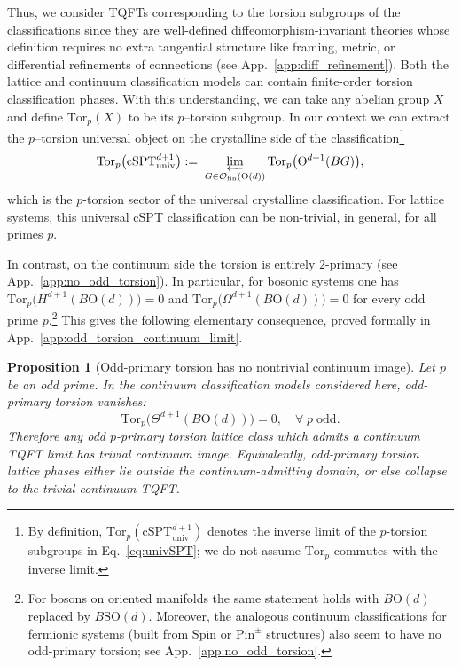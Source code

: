 \documentclass[aps,prx,reprint,superscriptaddress,twocolumn,amsmath,amssymb,amsfonts, nofootinbib]{revtex4-2}
\newcommand{\SO}{\text{SO}}
\newcommand{\tor}{\text{Tor}}
\theoremstyle{apsstyle}
\newtheorem{proposition}[theorem]{Proposition}
\begin{document}
Thus, we consider TQFTs corresponding to the torsion subgroups of the classifications since they are well-defined diffeomorphism-invariant theories whose definition requires no extra tangential structure like framing, metric, or differential refinements of connections (see App.~\ref{app:diff_refinement}). Both the lattice and continuum classification models can contain finite-order torsion classification phases.  With this understanding, we can take any abelian group $X$ and define $\tor_{p}(X)$ to be its $p$–torsion subgroup. In our context we can extract the $p$–torsion universal object on the crystalline side of the classification\footnote{By definition, $\tor_p(\mathrm{cSPT}^{d+1}_{\mathrm{univ}})$ denotes the inverse limit of the $p$-torsion subgroups in Eq.~\eqref{eq:univSPT}; we do not assume $\tor_p$ commutes with the inverse limit.}
\begin{equation}
    \tor_{p}\bigl(\mathrm{cSPT}^{d+1}_{\mathrm{univ}}\bigr)
    :=\;
    \varprojlim_{G\in\mathcal{O}_{\mathrm{fin}}(\mathrm{O}(d))}\tor_{p}\bigl(\Theta^{d+1}(BG)\bigr),
    \label{eq:univSPT}
\end{equation}
\noindent which is the $p$-torsion sector of the universal crystalline classification.
For lattice systems, this universal cSPT classification can be non-trivial, in general, for all primes $p$. 

In contrast, on the continuum side the torsion is entirely $2$-primary (see App.~\ref{app:no_odd_torsion}).
In particular, for bosonic systems one has $\tor_{p}\bigl(H^{d+1}(B\mathrm{O}(d))\bigr)=0$ and $\tor_{p}\bigl(\Omega^{d+1}(B\mathrm{O}(d))\bigr)=0$
for every odd prime $p$.\footnote{For bosons on oriented manifolds the same statement holds with $B\mathrm{O}(d)$ replaced by $B\SO(d)$.
Moreover, the analogous continuum classifications for fermionic systems (built from $\mathrm{Spin}$ or $\mathrm{Pin}^{\pm}$ structures) also seem to have no odd-primary torsion; see App.~\ref{app:no_odd_torsion}.} This gives the following elementary consequence, proved formally in App.~\ref{app:odd_torsion_continuum_limit}.

\begin{proposition}[Odd-primary torsion has no nontrivial continuum image]
\label{prop:main_odd_torsion_collapse}
Let $p$ be an odd prime. In the continuum classification models considered here, odd-primary torsion vanishes:
\begin{equation}
\tor_p\bigl(\Theta^{d+1}(B\mathrm{O}(d))\bigr)=0, \quad \forall \;p\;\text{odd}.
\end{equation}
Therefore any odd $p$-primary torsion lattice class which admits a continuum TQFT limit has trivial continuum image. Equivalently, odd-primary torsion lattice phases either lie outside the continuum-admitting domain, or else collapse to the trivial continuum TQFT.
\end{proposition}
\end{document}
